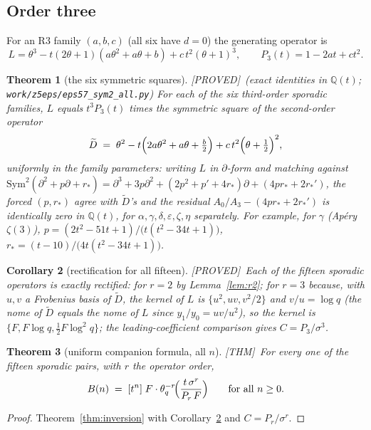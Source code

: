 \documentclass[11pt,reqno]{amsart}
\theoremstyle{plain}
\newtheorem{theorem}{Theorem}[section]
\newtheorem{corollary}[theorem]{Corollary}
\theoremstyle{definition}
\theoremstyle{remark}
\newcommand{\Q}{\mathbb{Q}}
\newcommand{\thq}{\theta_q}
\newcommand{\Thm}{\textup{\textsf{[THM]}}}
\newcommand{\Proved}{\textup{\textsf{[PROVED]}}}
\begin{document}
\subsection{Order three}
For an R3 family $(a,b,c)$ (all six have $d=0$) the generating operator is
\[
L=\theta^3-t(2\theta+1)(a\theta^2+a\theta+b)+c\,t^2(\theta+1)^3,
\qquad
P_3(t)=1-2at+ct^2 .
\]

\begin{theorem}[the six symmetric squares]\label{thm:sym2}
\Proved\ (exact identities in $\Q(t)$;
\texttt{work/z5eps/eps57\_sym2\_all.py})\quad
For each of the six third-order sporadic families, $L$ equals
$t^3P_3(t)$ times the symmetric square of the second-order operator
\[
\widetilde D\;=\;\theta^2-t\Bigl(2a\theta^2+a\theta+\tfrac b2\Bigr)
+c\,t^2\Bigl(\theta+\tfrac12\Bigr)^2 ,
\]
uniformly in the family parameters: writing $L$ in $\partial$-form and
matching against
$\mathrm{Sym}^2(\partial^2+p\partial+r_\ast)=\partial^3+3p\partial^2
+(2p^2+p'+4r_\ast)\partial+(4pr_\ast+2r_\ast')$, the forced
$(p,r_\ast)$ agree with $\widetilde D$'s and the residual
$A_0/A_3-(4pr_\ast+2r_\ast')$ is \emph{identically zero} in $\Q(t)$, for
$\alpha, \gamma, \delta, \varepsilon, \zeta, \eta$ separately. For
example, for $\gamma$ (Ap\'ery $\zeta(3)$),
$p=(2t^2-51t+1)/\bigl(t(t^2-34t+1)\bigr)$,
$r_\ast=(t-10)/\bigl(4t(t^2-34t+1)\bigr)$.
\end{theorem}

\begin{corollary}[rectification for all fifteen]\label{cor:rect15}
\Proved\
Each of the fifteen sporadic operators is exactly rectified: for $r=2$ by
Lemma~\ref{lem:r2}; for $r=3$ because, with $u,v$ a Frobenius basis of
$\widetilde D$, the kernel of $L$ is $\{u^2,uv,v^2/2\}$ and
$v/u=\log q$ (the nome of $\widetilde D$ equals the nome of $L$ since
$y_1/y_0=uv/u^2$), so the kernel is
$\{F,F\log q,\tfrac12F\log^2q\}$; the leading-coefficient comparison gives
$C=P_3/\sigma^3$.
\end{corollary}

\begin{theorem}[uniform companion formula, all $n$]\label{thm:companion}
\Thm\
For every one of the fifteen sporadic pairs, with $r$ the operator order,
\[
B(n)\;=\;[t^n]\;F\cdot\thq^{-r}\!\Bigl(\frac{t\,\sigma^r}{P_r\,F}\Bigr)
\qquad\text{for all }n\ge0 .
\]
\end{theorem}

\begin{proof}
Theorem~\ref{thm:inversion} with Corollary~\ref{cor:rect15} and
$C=P_r/\sigma^r$.
\end{proof}
\end{document}

